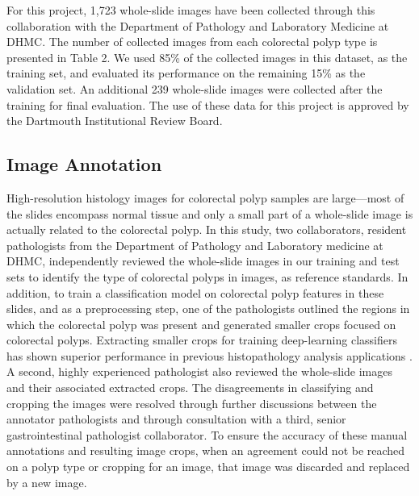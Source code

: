 \documentclass[review]{elsarticle}
\begin{document}
For this project, 1,723 whole-slide images have been collected through this collaboration with the Department of Pathology and Laboratory Medicine at DHMC. The number of collected images from each colorectal polyp type is presented in Table 2. We used 85\% of the collected images in this dataset, as the training set, and evaluated its performance on the remaining 15\% as the validation set. An additional 239 whole-slide images were collected after the training for final evaluation. The use of these data for this project is approved by the Dartmouth Institutional Review Board.

\subsection{Image Annotation}\label{annotation}
High-resolution histology images for colorectal polyp samples are large---most of the slides encompass normal tissue and only a small part of a whole-slide image is actually related to the colorectal polyp. In this study, two collaborators, resident pathologists from the Department of Pathology and Laboratory medicine at DHMC, independently reviewed the whole-slide images in our training and test sets to identify the type of colorectal polyps in images, as reference standards. In addition, to train a classification model on colorectal polyp features in these slides, and as a preprocessing step, one of the pathologists outlined the regions in which the colorectal polyp was present and generated smaller crops focused on colorectal polyps. Extracting smaller crops for training deep-learning classifiers has shown superior performance in previous histopathology analysis applications \citep{bengio2009learning}. A second, highly experienced pathologist also reviewed the whole-slide images and their associated extracted crops. The disagreements in classifying and cropping the images were resolved through further discussions between the annotator pathologists and through consultation with a third, senior gastrointestinal pathologist collaborator. To ensure the accuracy of these manual annotations and resulting image crops, when an agreement could not be reached on a polyp type or cropping for an image, that image was discarded and replaced by a new image.
\end{document}
